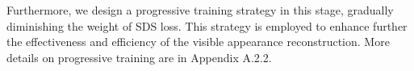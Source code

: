 Furthermore, we design a progressive training strategy in this stage, gradually diminishing the weight of SDS loss. This strategy is employed to enhance further the effectiveness and efficiency of the visible appearance reconstruction. More details on progressive training are in Appendix A.2.2.



